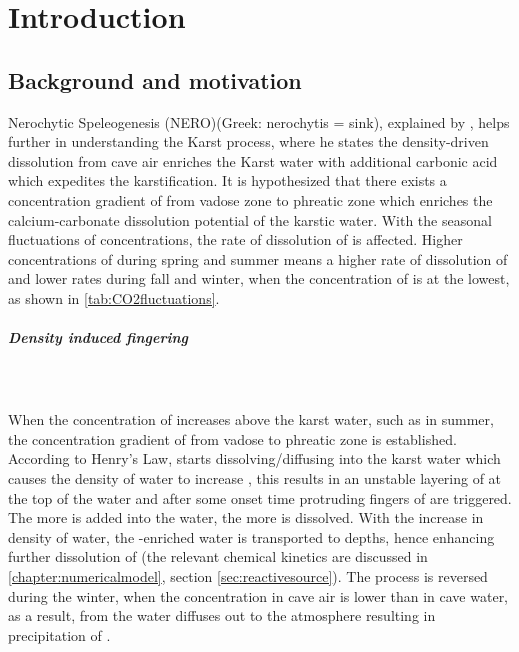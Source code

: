 \chapter{Introduction}\label{chapter:introduction}
\thispagestyle{empty}
\section{Background and motivation}
Nerochytic Speleogenesis (NERO)(Greek: nerochytis = sink), explained by \citet{Scherzer2017}, 
helps further in understanding the Karst process, where he states the density-driven  dissolution 
from cave air enriches the Karst water with additional carbonic acid which expedites the karstification. 
It is hypothesized that there exists a concentration gradient of  from vadose zone to phreatic zone 
which enriches the calcium-carbonate dissolution potential of the karstic water. 
With the seasonal fluctuations of  concentrations, the rate of dissolution of  is affected. 
Higher concentrations of  during spring and summer means a higher rate of dissolution of  and lower rates 
during fall and winter, when the concentration of  is at the lowest, as shown in \cref{tab:CO2fluctuations}.

\paragraph*{Density induced fingering}\mbox{}\\ \\
When the concentration of  increases above the karst water, such as in summer, the concentration gradient of  
from vadose to phreatic zone is established. According to Henry's Law,  starts dissolving/diffusing into the karst water 
which causes the density of water to increase \cite{garcia2001density}, this results in an unstable layering of  at 
the top of the water and after some onset time protruding fingers of  are triggered. The more  is added into the water, 
the more  is dissolved. With the increase in density of water, the -enriched water 
is transported to depths, hence enhancing further dissolution of  (the relevant chemical kinetics are 
discussed in \cref{chapter:numericalmodel}, section \cref{sec:reactivesource}). The process is reversed during the winter, 
when the  concentration in cave air is lower than in cave water, as a result,  from the water diffuses 
out to the atmosphere resulting in precipitation of .\\ 

